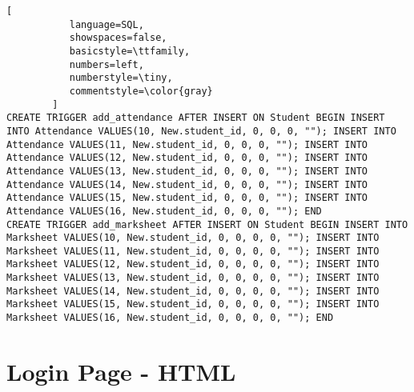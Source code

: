 \begin{lstlisting}[
           language=SQL,
           showspaces=false,
           basicstyle=\ttfamily,
           numbers=left,
           numberstyle=\tiny,
           commentstyle=\color{gray}
        ]
CREATE TRIGGER add_attendance AFTER INSERT ON Student BEGIN INSERT INTO Attendance VALUES(10, New.student_id, 0, 0, 0, ""); INSERT INTO Attendance VALUES(11, New.student_id, 0, 0, 0, ""); INSERT INTO Attendance VALUES(12, New.student_id, 0, 0, 0, ""); INSERT INTO Attendance VALUES(13, New.student_id, 0, 0, 0, ""); INSERT INTO Attendance VALUES(14, New.student_id, 0, 0, 0, ""); INSERT INTO Attendance VALUES(15, New.student_id, 0, 0, 0, ""); INSERT INTO Attendance VALUES(16, New.student_id, 0, 0, 0, ""); END
CREATE TRIGGER add_marksheet AFTER INSERT ON Student BEGIN INSERT INTO Marksheet VALUES(10, New.student_id, 0, 0, 0, 0, ""); INSERT INTO Marksheet VALUES(11, New.student_id, 0, 0, 0, 0, ""); INSERT INTO Marksheet VALUES(12, New.student_id, 0, 0, 0, 0, ""); INSERT INTO Marksheet VALUES(13, New.student_id, 0, 0, 0, 0, ""); INSERT INTO Marksheet VALUES(14, New.student_id, 0, 0, 0, 0, ""); INSERT INTO Marksheet VALUES(15, New.student_id, 0, 0, 0, 0, ""); INSERT INTO Marksheet VALUES(16, New.student_id, 0, 0, 0, 0, ""); END
\end{lstlisting}
\pagebreak

\section{Login Page - HTML}
\begin{lstlisting}[language=HTML]
\end{lstlisting}
\pagebreak


